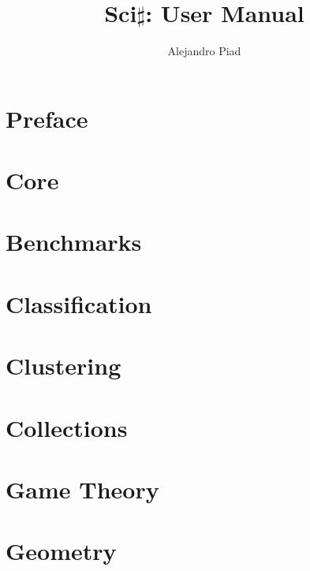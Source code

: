 \documentclass[10pt,a4paper]{report}
\author{Alejandro Piad}
\title{\Huge Sci$\sharp$: User Manual}
\begin{document}

\maketitle
\tableofcontents

\chapter*{Preface}
 

\chapter{Core}
 

\chapter{Benchmarks}

\chapter{Classification}

\chapter{Clustering}

\chapter{Collections}

\chapter{Game Theory}

\chapter{Geometry}
\end{document}
